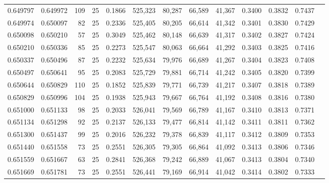 \begin{tabular}{rrrrrrrrrrrrr}
0.649797 & 0.649972 &   109 &  25 &                                     0.1866 & 525,323 &  80,287 &  66,589 &  41,367 & 0.3400 & 0.3832 & 0.7437 \\
0.649974 & 0.650097 &    82 &  25 &                                     0.2336 & 525,405 &  80,205 &  66,614 &  41,342 & 0.3401 & 0.3830 & 0.7429 \\
0.650098 & 0.650210 &    57 &  25 &                                     0.3049 & 525,462 &  80,148 &  66,639 &  41,317 & 0.3402 & 0.3827 & 0.7424 \\
0.650210 & 0.650336 &    85 &  25 &                                     0.2273 & 525,547 &  80,063 &  66,664 &  41,292 & 0.3403 & 0.3825 & 0.7416 \\
0.650337 & 0.650496 &    87 &  25 &                                     0.2232 & 525,634 &  79,976 &  66,689 &  41,267 & 0.3404 & 0.3823 & 0.7408 \\
0.650497 & 0.650641 &    95 &  25 &                                     0.2083 & 525,729 &  79,881 &  66,714 &  41,242 & 0.3405 & 0.3820 & 0.7399 \\
0.650644 & 0.650829 &   110 &  25 &                                     0.1852 & 525,839 &  79,771 &  66,739 &  41,217 & 0.3407 & 0.3818 & 0.7389 \\
0.650829 & 0.650996 &   104 &  25 &                                     0.1938 & 525,943 &  79,667 &  66,764 &  41,192 & 0.3408 & 0.3816 & 0.7380 \\
0.651000 & 0.651133 &    98 &  25 &                                     0.2033 & 526,041 &  79,569 &  66,789 &  41,167 & 0.3410 & 0.3813 & 0.7371 \\
0.651134 & 0.651298 &    92 &  25 &                                     0.2137 & 526,133 &  79,477 &  66,814 &  41,142 & 0.3411 & 0.3811 & 0.7362 \\
0.651300 & 0.651437 &    99 &  25 &                                     0.2016 & 526,232 &  79,378 &  66,839 &  41,117 & 0.3412 & 0.3809 & 0.7353 \\
0.651440 & 0.651558 &    73 &  25 &                                     0.2551 & 526,305 &  79,305 &  66,864 &  41,092 & 0.3413 & 0.3806 & 0.7346 \\
0.651559 & 0.651667 &    63 &  25 &                                     0.2841 & 526,368 &  79,242 &  66,889 &  41,067 & 0.3413 & 0.3804 & 0.7340 \\
0.651669 & 0.651781 &    73 &  25 &                                     0.2551 & 526,441 &  79,169 &  66,914 &  41,042 & 0.3414 & 0.3802 & 0.7333 \\

\end{tabular}
